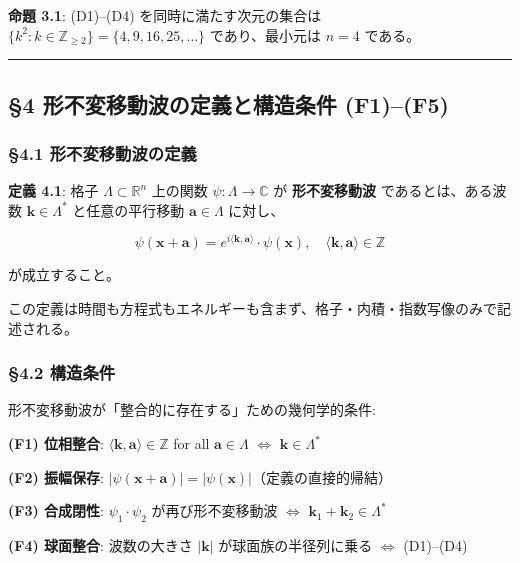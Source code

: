 \documentclass[
  a4paper,11pt]{ltjsarticle}
\theoremstyle{definition}
\theoremstyle{remark}
\begin{document}
\textbf{命題 3.1}: (D1)--(D4) を同時に満たす次元の集合は
\(\{k^2 : k \in \mathbb{Z}_{\geq 2}\} = \{4, 9, 16, 25, \ldots\}\)
であり、最小元は \(n = 4\) である。

\begin{center}\rule{0.5\linewidth}{0.5pt}\end{center}

\subsection{§4 形不変移動波の定義と構造条件
(F1)--(F5)}\label{ux5f62ux4e0dux5909ux79fbux52d5ux6ce2ux306eux5b9aux7fa9ux3068ux69cbux9020ux6761ux4ef6-f1f5}

\subsubsection{§4.1
形不変移動波の定義}\label{ux5f62ux4e0dux5909ux79fbux52d5ux6ce2ux306eux5b9aux7fa9}

\textbf{定義 4.1}: 格子 \(\Lambda \subset \mathbb{R}^n\) 上の関数
\(\psi : \Lambda \to \mathbb{C}\) が \textbf{形不変移動波}
であるとは、ある波数 \(\mathbf{k} \in \Lambda^*\) と任意の平行移動
\(\mathbf{a} \in \Lambda\) に対し、

\[\psi(\mathbf{x} + \mathbf{a}) = e^{i\langle \mathbf{k}, \mathbf{a} \rangle} \cdot \psi(\mathbf{x}), \quad \langle \mathbf{k}, \mathbf{a} \rangle \in \mathbb{Z}\]

が成立すること。

この定義は時間も方程式もエネルギーも含まず、格子・内積・指数写像のみで記述される。

\subsubsection{§4.2 構造条件}\label{ux69cbux9020ux6761ux4ef6}

形不変移動波が「整合的に存在する」ための幾何学的条件:

\textbf{(F1) 位相整合}:
\(\langle \mathbf{k}, \mathbf{a} \rangle \in \mathbb{Z}\) for all
\(\mathbf{a} \in \Lambda\) \(\Leftrightarrow\)
\(\mathbf{k} \in \Lambda^*\)

\textbf{(F2) 振幅保存}:
\(|\psi(\mathbf{x} + \mathbf{a})| = |\psi(\mathbf{x})|\)（定義の直接的帰結）

\textbf{(F3) 合成閉性}: \(\psi_1 \cdot \psi_2\) が再び形不変移動波
\(\Leftrightarrow\) \(\mathbf{k}_1 + \mathbf{k}_2 \in \Lambda^*\)

\textbf{(F4) 球面整合}: 波数の大きさ \(|\mathbf{k}|\)
が球面族の半径列に乗る \(\Leftrightarrow\) (D1)--(D4)
\end{document}
